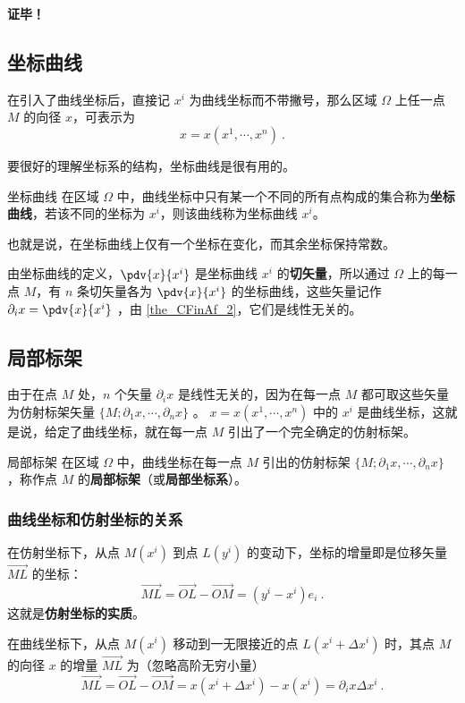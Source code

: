 \textbf{证毕！}
\subsection{坐标曲线}
在引入了曲线坐标后，直接记 $x^i$ 为曲线坐标而不带撇号，那么区域 $\Omega$ 上任一点 $M$ 的向径 $x$，可表示为
\begin{equation}
x=x(x^1,\cdots,x^n)~.
\end{equation}

要很好的理解坐标系的结构，坐标曲线是很有用的。
\begin{definition}{坐标曲线}
在区域 $\Omega$ 中，曲线坐标中只有某一个不同的所有点构成的集合称为\textbf{坐标曲线}，若该不同的坐标为 $x^i$，则该曲线称为坐标曲线 $x^i$。
\end{definition}
也就是说，在坐标曲线上仅有一个坐标在变化，而其余坐标保持常数。

由坐标曲线的定义，$\pdv{x}{x^i}$ 是坐标曲线 $x^i$ 的\textbf{切矢量}，所以通过 $\Omega$ 上的每一点 $M$，有 $n$ 条切矢量各为 $\pdv{x}{x^i}$ 的坐标曲线，这些矢量记作 $\partial_i x=\pdv{x}{x^i}$ ，由 \autoref{the_CFinAf_2}，它们是线性无关的。
\subsection{局部标架}
由于在点 $M$ 处，$n$ 个矢量 $\partial_i x$ 是线性无关的，因为在每一点 $M$ 都可取这些矢量为仿射标架矢量 $\{M;\partial_1 x,\cdots,\partial_n x\}$ 。 $x=x(x^1,\cdots,x^n)$ 中的 $x^i$ 是曲线坐标，这就是说，给定了曲线坐标，就在每一点 $M$ 引出了一个完全确定的仿射标架。
\begin{definition}{局部标架}\label{def_CFinAf_1}
在区域 $\Omega$ 中，曲线坐标在每一点 $M$ 引出的仿射标架 $\{M;\partial_1 x,\cdots,\partial_n x\}$ ，称作点 $M$ 的\textbf{局部标架}（或\textbf{局部坐标系}）。
\end{definition} 
\subsubsection{曲线坐标和仿射坐标的关系}
在仿射坐标下，从点 $M(x^i)$ 到点 $L(y^i)$ 的变动下，坐标的增量即是位移矢量 $\overrightarrow{ML}$ 的坐标：
\begin{equation}
\overrightarrow{ML}=\overrightarrow{OL}-\overrightarrow{OM}=(y^i-x^i)e_i~.
\end{equation}
这就是\textbf{仿射坐标的实质}。

在曲线坐标下，从点 $M(x^i)$ 移动到一无限接近的点 $L(x^i+\Delta x^i)$ 时，其点 $M$ 的向径 $x$ 的增量 $\overrightarrow{ML}$ 为（忽略高阶无穷小量）
\begin{equation}\label{eq_CFinAf_4}
\overrightarrow{ML}=\overrightarrow{OL}-\overrightarrow{OM}=x(x^i+\Delta x^i)-x(x^i)=\partial_i x\Delta x^i~.
\end{equation}


